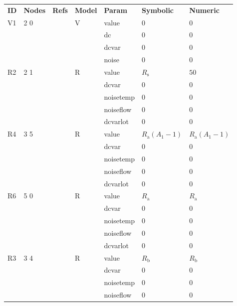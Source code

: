 \begin{table}[h]
\centering
\begin{tabular}[c]{lllllll}
\textbf{ID} & \textbf{Nodes} & \textbf{Refs} & \textbf{Model} & \textbf{Param} & \textbf{Symbolic} & \textbf{Numeric} \\ 
\rowcolor{myyellow}
\small{V1} &\small{2 0 } & &\small{V} &\small{value} &$0$ &$0$ \\ 
 & & & &\small{dc} &$0$ &$0$ \\ 
\rowcolor{myyellow}
 & & & &\small{dcvar} &$0$ &$0$ \\ 
 & & & &\small{noise} &$0$ &$0$ \\ 
\rowcolor{myyellow}
\small{R2} &\small{2 1 } & &\small{R} &\small{value} &$R_{\mathrm{s}}$ &$50$ \\ 
 & & & &\small{dcvar} &$0$ &$0$ \\ 
\rowcolor{myyellow}
 & & & &\small{noisetemp} &$0$ &$0$ \\ 
 & & & &\small{noiseflow} &$0$ &$0$ \\ 
\rowcolor{myyellow}
 & & & &\small{dcvarlot} &$0$ &$0$ \\ 
\small{R4} &\small{3 5 } & &\small{R} &\small{value} &$R_{\mathrm{a}} \left(A_{1} - 1\right)$ &$R_{\mathrm{a}} \left(A_{1} - 1\right)$ \\ 
\rowcolor{myyellow}
 & & & &\small{dcvar} &$0$ &$0$ \\ 
 & & & &\small{noisetemp} &$0$ &$0$ \\ 
\rowcolor{myyellow}
 & & & &\small{noiseflow} &$0$ &$0$ \\ 
 & & & &\small{dcvarlot} &$0$ &$0$ \\ 
\rowcolor{myyellow}
\small{R6} &\small{5 0 } & &\small{R} &\small{value} &$R_{\mathrm{a}}$ &$R_{\mathrm{a}}$ \\ 
 & & & &\small{dcvar} &$0$ &$0$ \\ 
\rowcolor{myyellow}
 & & & &\small{noisetemp} &$0$ &$0$ \\ 
 & & & &\small{noiseflow} &$0$ &$0$ \\ 
\rowcolor{myyellow}
 & & & &\small{dcvarlot} &$0$ &$0$ \\ 
\small{R3} &\small{3 4 } & &\small{R} &\small{value} &$R_{\mathrm{b}}$ &$R_{\mathrm{b}}$ \\ 
\rowcolor{myyellow}
 & & & &\small{dcvar} &$0$ &$0$ \\ 
 & & & &\small{noisetemp} &$0$ &$0$ \\ 
\rowcolor{myyellow}
 & & & &\small{noiseflow} &$0$ &$0$ \\ 

\end{tabular}
\end{table}
